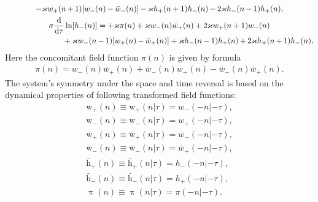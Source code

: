\documentclass[10pt,a4paper]{amsart}
\numberwithin{equation}{section}
\begin{document}
\begin{gather}
	 - \varkappa w_{+}(n\hspace{-0.4pt}+\hspace{-0.4pt}1)[w_{-}(n)\hspace{-0.4pt}-\hspace{-0.4pt}\bar{w}_{-}(n)]
	\hspace{-0.4pt}-\hspace{-0.4pt} \varkappa h_{+}(n+1)h_{-}(n)\hspace{-0.4pt} -\hspace{-0.4pt} 2\varkappa h_{-}(n\hspace{-0.4pt}-\hspace{-0.4pt}1)h_{+}(n),\nonumber
\\
	 \sigma\frac{\mathrm{d}}{\mathrm{d}\tau}\ln[h_{-}(n)] = +\varkappa \pi(n) + \varkappa w_{-}(n)\bar{w}_{+}(n) + 2\varkappa w_{+}(n+1)w_{-}(n) \label{eq-7.6}\\
\hspace{0.25mm}\hphantom{\sigma\frac{\mathrm{d}}{\mathrm{d}\tau}\ln[h_{-}(n)] =}{}
	 + \varkappa w_{-}(n\hspace{-0.4pt}-\hspace{-0.4pt}1)[w_{+}(n)\hspace{-0.4pt}-\hspace{-0.4pt}\bar{w}_{+}(n)]
	 + \varkappa h_{-}(n\hspace{-0.4pt}-\hspace{-0.4pt}1)h_{+}(n)\hspace{-0.4pt} +\hspace{-0.4pt} 2\varkappa h_{+}(n\hspace{-0.4pt}+\hspace{-0.4pt}1)h_{-}(n) .\nonumber
\end{gather}
Here the concomitant field function $\pi(n)$ is given by formula
\begin{gather*}%
	\pi(n)=w_{-}(n)\bar{w}_{+}(n)+\bar{w}_{-}(n)w_{+}(n)-\bar{w}_{-}(n)\bar{w}_{+}(n) .
\end{gather*}
The system's symmetry under the space and time reversal is based on the dynamical properties of following transformed field functions:
\begin{gather}\label{eq-7.8}
	\mathrm{w}_{+}(n)\equiv\mathrm{w}_{+}(n|\tau)=w_{-}(-n|-\tau),
\\ \label{eq-7.25}
	\mathrm{w}_{-}(n)\equiv\mathrm{w}_{-}(n|\tau)=w_{+}(-n|-\tau),
\\ \label{eq-7.26}
	\bar{\mathrm{w}}_{+}(n)\equiv\bar{\mathrm{w}}_{+}(n|\tau)=\bar{w}_{-}(-n|-\tau),
\\ \label{eq-7.27}
	\bar{\mathrm{w}}_{-}(n)\equiv\bar{\mathrm{w}}_{-}(n|\tau)=\bar{w}_{+}(-n|-\tau),
\\ \label{eq-7.28}
	\bar{\mathrm{h}}_{+}(n)\equiv\bar{\mathrm{h}}_{+}(n|\tau)=h_{-}(-n|-\tau),
\\ \label{eq-7.29}
	\bar{\mathrm{h}}_{-}(n)\equiv\bar{\mathrm{h}}_{-}(n|\tau)=h_{+}(-n|-\tau),
\\ %
	\uppi (n)\equiv\uppi(n|\tau)=\pi(-n|-\tau) . \nonumber
\end{gather}
\end{document}
